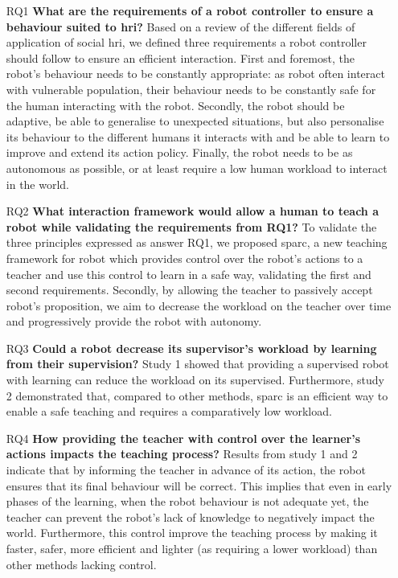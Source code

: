 \begin{itemize}
\item [RQ1] \textbf{What are the requirements of a robot controller to ensure a behaviour suited to \gls{hri}?} 
Based on a review of the different fields of application of social \gls{hri}, we defined three requirements a robot controller should follow to ensure an efficient interaction. First and foremost, the robot's behaviour needs to be constantly appropriate: as robot often interact with vulnerable population, their behaviour needs to be constantly safe for the human interacting with the robot. Secondly, the robot should be adaptive, be able to generalise to unexpected situations, but also personalise its behaviour to the different humans it interacts with and be able to learn to improve and extend its action policy. Finally, the robot needs to be as autonomous as possible, or at least require a low human workload to interact in the world.

\item [RQ2] \textbf{What interaction framework would allow a human to teach a robot while validating the requirements from RQ1?}
To validate the three principles expressed as answer RQ1, we proposed \gls{sparc}, a new teaching framework for robot which provides control over the robot's actions to a teacher and use this control to learn in a safe way, validating the first and second requirements. Secondly, by allowing the teacher to passively accept robot's proposition, we aim to decrease the workload on the teacher over time and progressively provide the robot with autonomy. 

\item [RQ3] \textbf{Could a robot decrease its supervisor's workload by learning from their supervision?}
Study 1 showed that providing a supervised robot with learning can reduce the workload on its supervised. Furthermore, study 2 demonstrated that, compared to other methods, \gls{sparc} is an efficient way to enable a safe teaching and requires a comparatively low workload.

\item [RQ4] \textbf{How providing the teacher with control over the learner's actions impacts the teaching process?} 
Results from study 1 and 2 indicate that by informing the teacher in advance of its action, the robot ensures that its final behaviour will be correct. This implies that even in early phases of the learning, when the robot behaviour is not adequate yet, the teacher can prevent the robot's lack of knowledge to negatively impact the world. Furthermore, this control improve the teaching process by making it faster, safer, more efficient and lighter (as requiring a lower workload) than other methods lacking control.


\end{itemize}
